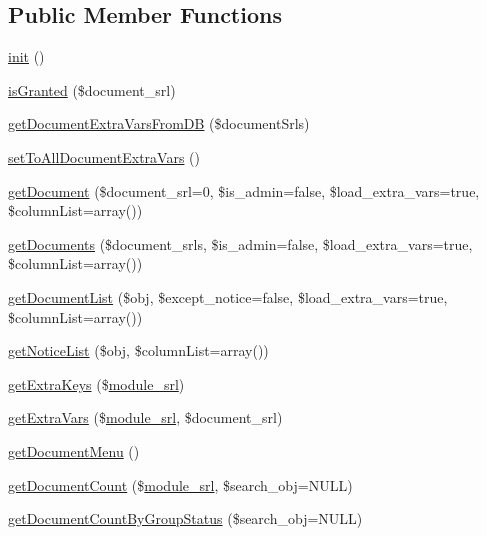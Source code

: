 \subsection*{Public Member Functions}
\begin{DoxyCompactItemize}
\item 
\hyperlink{classdocumentModel_a04a1f3814d77f78a588c61ab78ef1274}{init} ()
\item 
\hyperlink{classdocumentModel_acca118289b1b6e55c73dc21b7ed32d9c}{is\+Granted} (\$document\+\_\+srl)
\item 
\hyperlink{classdocumentModel_a10167011009da59ed649022e7ec42a39}{get\+Document\+Extra\+Vars\+From\+DB} (\$document\+Srls)
\item 
\hyperlink{classdocumentModel_a030147f71d77bdf6cf23798a2264445b}{set\+To\+All\+Document\+Extra\+Vars} ()
\item 
\hyperlink{classdocumentModel_a8846291323aaa3b090e7b8317f8175f2}{get\+Document} (\$document\+\_\+srl=0, \$is\+\_\+admin=false, \$load\+\_\+extra\+\_\+vars=true, \$column\+List=array())
\item 
\hyperlink{classdocumentModel_ae1ff6c76fde56ed76c9c7e4fa41d1525}{get\+Documents} (\$document\+\_\+srls, \$is\+\_\+admin=false, \$load\+\_\+extra\+\_\+vars=true, \$column\+List=array())
\item 
\hyperlink{classdocumentModel_a6b790f22fd3d00594e9a020694664d76}{get\+Document\+List} (\$obj, \$except\+\_\+notice=false, \$load\+\_\+extra\+\_\+vars=true, \$column\+List=array())
\item 
\hyperlink{classdocumentModel_a4a1ce3c359460cebecccbcb3047bf7bc}{get\+Notice\+List} (\$obj, \$column\+List=array())
\item 
\hyperlink{classdocumentModel_a6ba19d36ef767c052851a630823c300a}{get\+Extra\+Keys} (\$\hyperlink{ko_8install_8php_a370bb6450fab1da3e0ed9f484a38b761}{module\+\_\+srl})
\item 
\hyperlink{classdocumentModel_a38bc1b4332e7e8d7a0428b4a91a23198}{get\+Extra\+Vars} (\$\hyperlink{ko_8install_8php_a370bb6450fab1da3e0ed9f484a38b761}{module\+\_\+srl}, \$document\+\_\+srl)
\item 
\hyperlink{classdocumentModel_ac7c07ca7bd1c7e72f4fcacfb176097b0}{get\+Document\+Menu} ()
\item 
\hyperlink{classdocumentModel_aa5b09d4901c5733ad9795af72ed50f1c}{get\+Document\+Count} (\$\hyperlink{ko_8install_8php_a370bb6450fab1da3e0ed9f484a38b761}{module\+\_\+srl}, \$search\+\_\+obj=N\+U\+LL)
\item 
\hyperlink{classdocumentModel_a495a49acccae8f20257db40accdffb88}{get\+Document\+Count\+By\+Group\+Status} (\$search\+\_\+obj=N\+U\+LL)

\end{DoxyCompactItemize}
